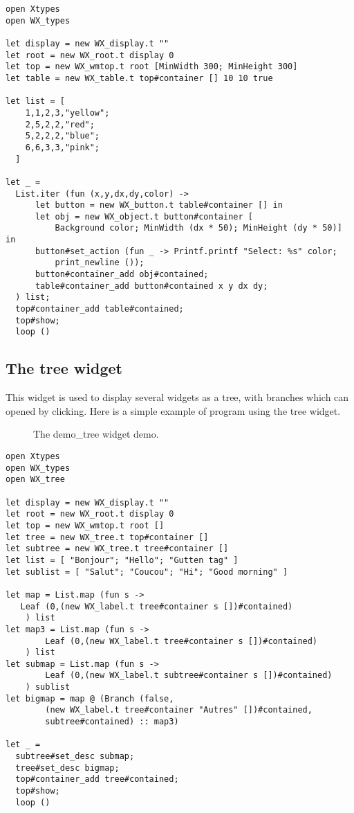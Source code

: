 \documentclass{report}
\newcommand{\psfigure}[3]{ %
  \begin{quote}\let\normalsize\small\caption{#3\label{fig:#2}}\end{quote}
  }
\begin{document}
\begin{verbatim}
open Xtypes
open WX_types
  
let display = new WX_display.t ""
let root = new WX_root.t display 0
let top = new WX_wmtop.t root [MinWidth 300; MinHeight 300]
let table = new WX_table.t top#container [] 10 10 true
  
let list = [
    1,1,2,3,"yellow"; 
    2,5,2,2,"red";
    5,2,2,2,"blue";
    6,6,3,3,"pink";
  ]

let _ =
  List.iter (fun (x,y,dx,dy,color) ->
      let button = new WX_button.t table#container [] in
      let obj = new WX_object.t button#container [
          Background color; MinWidth (dx * 50); MinHeight (dy * 50)] in
      button#set_action (fun _ -> Printf.printf "Select: %s" color;
          print_newline ());
      button#container_add obj#contained;
      table#container_add button#contained x y dx dy;      
  ) list;
  top#container_add table#contained;
  top#show;
  loop ()

\end{verbatim}

\subsection{The {\sf tree} widget}

 This widget is used to display several widgets as a tree, with branches 
which can opened by clicking. Here is a simple example of program using 
the tree widget.

\begin{figure}[t]
\begin{center}
\psfigure{0.3}{tree}{The demo\_tree widget demo.}
\end{center}
\end{figure}


\begin{verbatim}
open Xtypes
open WX_types
open WX_tree
  
let display = new WX_display.t ""
let root = new WX_root.t display 0
let top = new WX_wmtop.t root []
let tree = new WX_tree.t top#container []
let subtree = new WX_tree.t tree#container []
let list = [ "Bonjour"; "Hello"; "Gutten tag" ]
let sublist = [ "Salut"; "Coucou"; "Hi"; "Good morning" ]
  
let map = List.map (fun s ->
   Leaf (0,(new WX_label.t tree#container s [])#contained)
    ) list 
let map3 = List.map (fun s ->
        Leaf (0,(new WX_label.t tree#container s [])#contained)
    ) list
let submap = List.map (fun s ->
        Leaf (0,(new WX_label.t subtree#container s [])#contained)
    ) sublist
let bigmap = map @ (Branch (false,
        (new WX_label.t tree#container "Autres" [])#contained,
        subtree#contained) :: map3)

let _ =
  subtree#set_desc submap;
  tree#set_desc bigmap;
  top#container_add tree#contained;
  top#show;
  loop ()
\end{verbatim}
\end{document}
